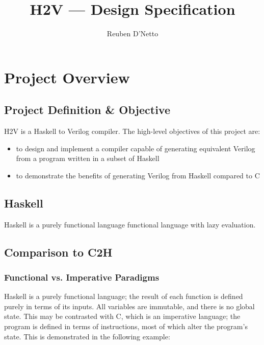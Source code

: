 \documentclass[english,onecolumn]{article}
\begin{document}
\title{H2V --- Design Specification}
\author{Reuben D'Netto}

\maketitle
\tableofcontents{}
\pagebreak{}

\section{Project Overview}
\subsection{Project Definition \& Objective}
H2V is a Haskell to Verilog compiler. The high-level objectives of this project are:
\begin{itemize}
\item to design and implement a compiler capable of generating equivalent Verilog from a program written in a subset of Haskell
\item to demonstrate the benefits of generating Verilog from Haskell compared to C
\end{itemize}

\subsection{Haskell}
Haskell is a purely functional language functional language with lazy evaluation. 

\subsection{Comparison to C2H}
\subsubsection{Functional vs. Imperative Paradigms}
Haskell is a purely functional language; the result of each function is defined purely in terms of its inputs. All variables are immutable, and there is no global state. This may be contrasted with C, which is an imperative language; the program is defined in terms of instructions, most of which alter the program's state. This is demonstrated in the following example:
\end{document}
